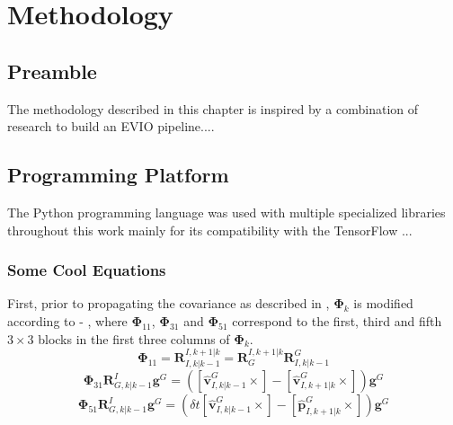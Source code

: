 \chapter{Methodology}
\label{ch:methodology}
\glsresetall %
\section*{Preamble}
The methodology described in this chapter is inspired by a combination of research to build an \gls{EVIO} pipeline....

\section{Programming Platform}
\label{sec:ProgramPlatform}

The Python programming language \cite{Python} was used with multiple specialized libraries throughout this work mainly for its compatibility with the TensorFlow ...


\subsection{Some Cool Equations}
First, prior to propagating the covariance as described in , $\mathbf{\Phi}_{k}$ is modified according to  - , where $\mathbf{\Phi}_{11}$, $\mathbf{\Phi}_{31}$ and $\mathbf{\Phi}_{51}$ correspond to the first, third and fifth $3\times3$ blocks in the first three columns of $\mathbf{\Phi}_{k}$.
\begin{equation}
\label{eq:Phi11}
\mathbf{\Phi}_{11} = \mathbf{R}_{I,k|k-1}^{I,k+1|k} = \mathbf{R}_{G}^{I,k+1|k}\mathbf{R}_{I,k|k-1}^{G}
\end{equation}
\begin{equation}
\label{eq:Phi31}
\mathbf{\Phi}_{31}\mathbf{R}_{G,k|k-1}^{I}\mathbf{g}^{G} = ([\hat{\mathbf{v}}_{I,k|k-1}^{G} \times] - [\hat{\mathbf{v}}_{I,k+1|k}^{G} \times])\mathbf{g}^{G}
\end{equation}
\begin{equation}
\label{eq:Phi51}
\mathbf{\Phi}_{51}\mathbf{R}_{G,k|k-1}^{I}\mathbf{g}^{G} = (\delta t[\hat{\mathbf{v}}_{I,k|k-1}^{G} \times] - [\hat{\mathbf{p}}_{I,k+1|k}^{G} \times])\mathbf{g}^{G}
\end{equation}
